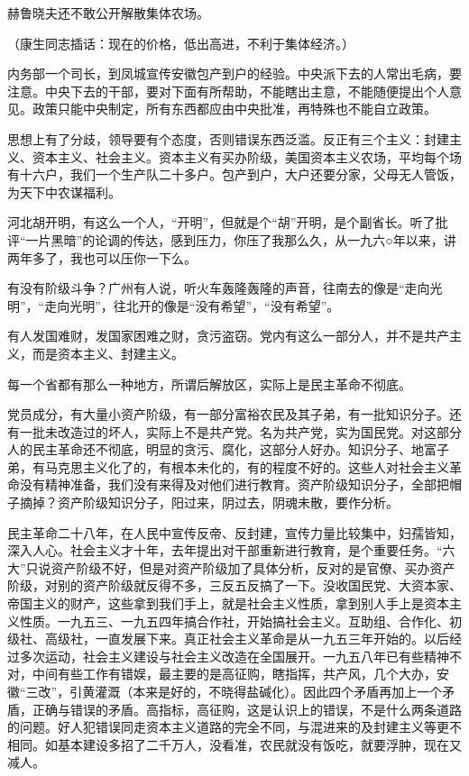 赫鲁晓夫还不敢公开解散集体农场。

（康生同志插话：现在的价格，低出高进，不利于集体经济。）

内务部一个司长，到凤城宣传安徽包产到户的经验。中央派下去的人常出毛病，要注意。中央下去的干部，要对下面有所帮助，不能瞎出主意，不能随便提出个人意见。政策只能中央制定，所有东西都应由中央批准，再特殊也不能自立政策。

思想上有了分歧，领导要有个态度，否则错误东西泛滥。反正有三个主义：封建主义、资本主义、社会主义。资本主义有买办阶级，美国资本主义农场，平均每个场有十六户，我们一个生产队二十多户。包产到户，大户还要分家，父母无人管饭，为天下中农谋福利。

河北胡开明，有这么一个人，“开明”，但就是个“胡”开明，是个副省长。听了批评“一片黑暗”的论调的传达，感到压力，你压了我那么久，从一九六○年以来，讲两年多了，我也可以压你一下么。

有没有阶级斗争？广州有人说，听火车轰隆轰隆的声音，往南去的像是“走向光明”，“走向光明”，往北开的像是“没有希望”，“没有希望”。

有人发国难财，发国家困难之财，贪污盗窃。党内有这么一部分人，并不是共产主义，而是资本主义、封建主义。

每一个省都有那么一种地方，所谓后解放区，实际上是民主革命不彻底。

党员成分，有大量小资产阶级，有一部分富裕农民及其子弟，有一批知识分子。还有一批未改造过的坏人，实际上不是共产党。名为共产党，实为国民党。对这部分人的民主革命还不彻底，明显的贪污、腐化，这部分人好办。知识分子、地富子弟，有马克思主义化了的，有根本未化的，有的程度不好的。这些人对社会主义革命没有精神准备，我们没有来得及对他们进行教育。资产阶级知识分子，全部把帽子摘掉？资产阶级知识分子，阳过来，阴过去，阴魂未散，要作分析。

民主革命二十八年，在人民中宣传反帝、反封建，宣传力量比较集中，妇孺皆知，深入人心。社会主义才十年，去年提出对干部重新进行教育，是个重要任务。“六大”只说资产阶级不好，但是对资产阶级加了具体分析，反对的是官僚、买办资产阶级，对别的资产阶级就反得不多，三反五反搞了一下。没收国民党、大资本家、帝国主义的财产，这些拿到我们手上，就是社会主义性质，拿到别人手上是资本主义性质。一九五三、一九五四年搞合作社，开始搞社会主义。互助组、合作化、初级社、高级社，一直发展下来。真正社会主义革命是从一九五三年开始的。以后经过多次运动，社会主义建设与社会主义改造在全国展开。一九五八年已有些精神不对，中间有些工作有错娱，最主要的是高征购，瞎指挥，共产风，几个大办，安徽“三改”，引黄灌溉（本来是好的，不晓得盐碱化）。因此四个矛盾再加上一个矛盾，正确与错误的矛盾。高指标，高征购，这是认识上的错误，不是什么两条道路的问题。好人犯错误同走资本主义道路的完全不同，与混进来的及封建主义等更不相同。如基本建设多招了二千万人，没看准，农民就没有饭吃，就要浮肿，现在又减人。

